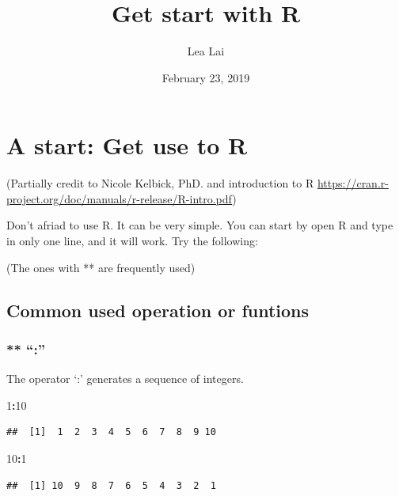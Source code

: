 \documentclass[]{article}
\title{Get start with R}
\author{Lea Lai}
\date{February 23, 2019}
\newenvironment{Shaded}{\begin{snugshade}}{\end{snugshade}}
\newcommand{\DecValTok}[1]{\textcolor[rgb]{0.00,0.00,0.81}{#1}}
\newcommand{\OperatorTok}[1]{\textcolor[rgb]{0.81,0.36,0.00}{\textbf{#1}}}
\begin{document}
\maketitle

{
\setcounter{tocdepth}{2}
\tableofcontents
}
\hypertarget{a-start-get-use-to-r}{%
\section{A start: Get use to R}\label{a-start-get-use-to-r}}

(Partially credit to Nicole Kelbick, PhD. and introduction to R
\url{https://cran.r-project.org/doc/manuals/r-release/R-intro.pdf})

Don't afriad to use R. It can be very simple. You can start by open R
and type in only one line, and it will work. Try the following:

(The ones with ** are frequently used)

\hypertarget{common-used-operation-or-funtions}{%
\subsection{Common used operation or
funtions}\label{common-used-operation-or-funtions}}

\hypertarget{section}{%
\subsubsection{** ``:''}\label{section}}

The operator `:' generates a sequence of integers.

\begin{Shaded}
\begin{Highlighting}[]
\DecValTok{1}\OperatorTok{:}\DecValTok{10}
\end{Highlighting}
\end{Shaded}

\begin{verbatim}
##  [1]  1  2  3  4  5  6  7  8  9 10
\end{verbatim}

\begin{Shaded}
\begin{Highlighting}[]
\DecValTok{10}\OperatorTok{:}\DecValTok{1}
\end{Highlighting}
\end{Shaded}

\begin{verbatim}
##  [1] 10  9  8  7  6  5  4  3  2  1
\end{verbatim}
\end{document}
